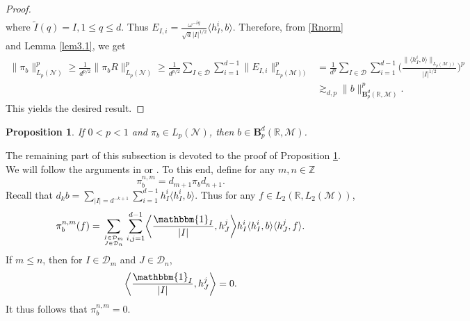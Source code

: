 \documentclass[oneside,english,a4wide]{amsart}
\numberwithin{equation}{section}
\numberwithin{figure}{section}
\theoremstyle{plain}
\theoremstyle{plain}
\newtheorem{proposition}[thm]{Proposition}
\theoremstyle{definition}
\theoremstyle{plain}
\theoremstyle{remark}
\theoremstyle{definition}
\theoremstyle{remark}
\theoremstyle{definition}
\newcommand{\M}{{\mathcal M}}
\newcommand{\8}{\infty}
\begin{document}
\begin{proof}
\begin{equation*}
\begin{aligned}
		\end{aligned}
	\end{equation*}
	where $\tilde{I}(q)=I, 1\le q\le d$. Thus $E_{I,i}=\frac{\omega^{-iq}}{\sqrt{d}|I|^{1/2}} \langle h_I^i,b\rangle$. Therefore, from \eqref{Rnorm} and Lemma \ref{lem3.1}, we get
	\begin{equation*}
		\begin{aligned}
			\|\pi_b\|^p_{L_p(\mathcal{N})}\ge \frac{1}{d^{p/2}} \|\pi_bR\|^p_{L_p(\mathcal{N})}\ge \frac{1}{d^{p/2}} \sum_{I\in \mathcal{D}}\sum_{i=1}^{d-1}\|E_{I,i}\|^p_{L_p(\mathcal{M}) )}{}&= \frac{1}{d^{p}}\sum_{I\in \mathcal{D}}\sum_{i=1}^{d-1}\biggl(\frac{\|\langle h_I^i,b\rangle\|_{L_p(\mathcal{M}) )}}{|I|^{1/2}}\biggr)^p\\&\gtrsim_{d,p} \|b\|^p_{\pmb{B}^d_p(\mathbb{R},\M)}.
		\end{aligned}
	\end{equation*}
	This yields the desired result.
\end{proof}

\begin{proposition}\label{Case 5}
	If $0<p<1$ and $\pi_b\in L_p(\mathcal{N})$, then $b\in \pmb{B}_p^d(\mathbb{R},\M)$.
\end{proposition}

The remaining part of this subsection is devoted to the proof of Proposition \ref{Case 5}. We will follow the arguments in \cite{P} or \cite{PS}. To this end, define for any $m,n \in \mathbb{Z}$
\begin{equation}\label{pibnm}
	\pi_b^{n,m}=d_{m+1}\pi_bd_{n+1}.
\end{equation}
Recall that $d_kb=\sum\limits_{|I|=d^{-k+1}}\sum\limits_{i=1}^{d-1}h_I^i\langle h_I^i,b\rangle$. Thus for any $ f\in L_2(\mathbb{R},L_2(\mathcal{M}))$,
\begin{equation*}
	\pi_b^{n,m}(f)=\sum_{I\in \mathcal{D}_m\atop J\in \mathcal{D}_n}\sum_{i,j=1}^{d-1}\biggl\langle \frac{\mathbbm{1}_I}{|I|},h_J^j\biggr\rangle h_I^i \langle h_I^i,b\rangle \langle h_J^j,f\rangle.
\end{equation*}
If $m\le n$, then for $I\in \mathcal{D}_m$ and $ J\in \mathcal{D}_n$,
$$ \biggl\langle \frac{\mathbbm{1}_I}{|I|},h_J^j\biggr\rangle=0.  $$
It thus follows that $\pi_b^{n,m}=0$.
\end{document}
